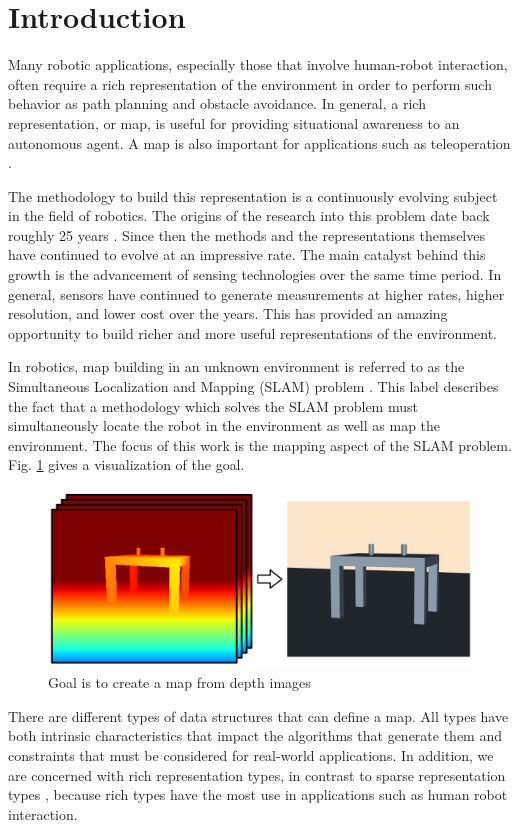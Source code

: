 
\section{Introduction} \label{sec:introduction}

Many robotic applications, especially those that involve human-robot
interaction, often require a rich representation of the environment in order to
perform such behavior as path planning and obstacle avoidance. In general, a
rich representation, or map, is useful for providing situational awareness to an
autonomous agent. A map is also important for applications such as teleoperation
\cite{Kadous2006}.

The methodology to build this representation is a continuously evolving subject
in the field of robotics. The origins of the research into this problem date
back roughly 25 years \cite{Lorensen1987}. Since then the methods and the
representations themselves have continued to evolve at an impressive rate. The
main catalyst behind this growth is the advancement of sensing technologies over
the same time period. In general, sensors have continued to generate
measurements at higher rates, higher resolution, and lower cost over the years.
This has provided an amazing opportunity to build richer and more useful
representations of the environment.

In robotics, map building in an unknown environment is referred to as the
Simultaneous Localization and Mapping (SLAM) problem \cite{Thrun2002}. This
label describes the fact that a methodology which solves the SLAM problem must
simultaneously locate the robot in the environment as well as map the
environment. The focus of this work is the mapping aspect of the SLAM problem.
Fig. \ref{fig:goal} gives a visualization of the goal.

\begin{figure}[h]%
\centering
\includegraphics[width=.5\textwidth]{figures/diagram_goal.png}
\caption{Goal is to create a map from depth images}
\label{fig:goal}
\end{figure}

There are different types of data structures that can define a map. All types have both
intrinsic characteristics that impact the algorithms that generate them and
constraints that must be considered for real-world applications. In
addition, we are concerned with rich representation types, in contrast to sparse
representation types \cite{Dissanayake2001}, because rich types have the most
use in applications such as human robot interaction.

